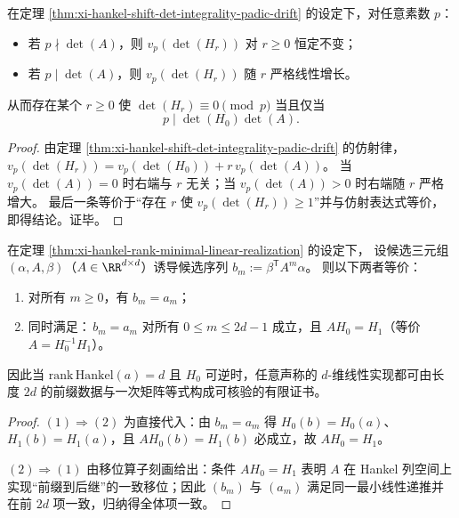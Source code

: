 \begin{corollary}\label{cor:xi-hankel-padic-stiffness-drift-dichotomy-badprimes}
在定理 \ref{thm:xi-hankel-shift-det-integrality-padic-drift} 的设定下，对任意素数 \(p\)：
\begin{itemize}
  \item 若 \(p\nmid\det(A)\)，则 \(v_p(\det(H_r))\) 对 \(r\ge 0\) 恒定不变；
  \item 若 \(p\mid\det(A)\)，则 \(v_p(\det(H_r))\) 随 \(r\) 严格线性增长。
\end{itemize}
从而存在某个 \(r\ge 0\) 使 \(\det(H_r)\equiv 0\pmod p\) 当且仅当
\[
p\mid \det(H_0)\det(A).
\]
\end{corollary}
\begin{proof}
由定理 \ref{thm:xi-hankel-shift-det-integrality-padic-drift} 的仿射律，
\(
v_p(\det(H_r))=v_p(\det(H_0))+r\,v_p(\det(A))
\)。
当 \(v_p(\det(A))=0\) 时右端与 \(r\) 无关；当 \(v_p(\det(A))>0\) 时右端随 \(r\) 严格增大。
最后一条等价于“存在 \(r\) 使 \(v_p(\det(H_r))\ge 1\)”并与仿射表达式等价，即得结论。证毕。
\end{proof}

\begin{proposition}\label{prop:xi-hankel-finite-certificate-principle}
在定理 \ref{thm:xi-hankel-rank-minimal-linear-realization} 的设定下，
设候选三元组 \((\alpha,A,\beta)\)（\(A\in\RR^{d\times d}\)）诱导候选序列 \(b_m:=\beta^{\mathsf T}A^{m}\alpha\)。
则以下两者等价：
\begin{enumerate}
  \item 对所有 \(m\ge 0\)，有 \(b_m=a_m\)；
  \item 同时满足：\(\,b_m=a_m\) 对所有 \(0\le m\le 2d-1\) 成立，且 \(AH_0=H_1\)（等价 \(A=H_0^{-1}H_1\)）。
\end{enumerate}
因此当 \(\mathrm{rank}\,\mathrm{Hankel}(a)=d\) 且 \(H_0\) 可逆时，任意声称的 \(d\)-维线性实现都可由长度 \(2d\) 的前缀数据与一次矩阵等式构成可核验的有限证书。
\end{proposition}
\begin{proof}
\((1)\Rightarrow(2)\) 为直接代入：由 \(b_m=a_m\) 得 \(H_0(b)=H_0(a)\)、\(H_1(b)=H_1(a)\)，且 \(AH_0(b)=H_1(b)\) 必成立，故 \(AH_0=H_1\)。
\par
\((2)\Rightarrow(1)\) 由移位算子刻画给出：条件 \(AH_0=H_1\) 表明 \(A\) 在 Hankel 列空间上实现“前缀到后继”的一致移位；因此 \((b_m)\) 与 \((a_m)\) 满足同一最小线性递推并在前 \(2d\) 项一致，归纳得全体项一致。
\end{proof}

